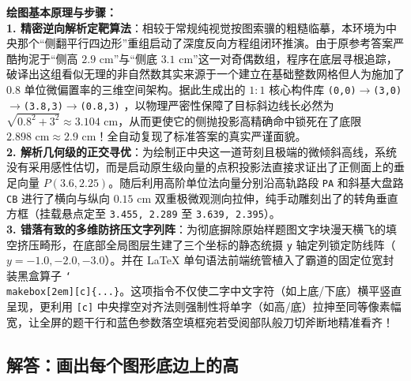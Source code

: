 \vspace{0.6cm}

{\small\color{blue!70!black}
\textbf{绘图基本原理与步骤：}\\
\textbf{1. 精密逆向解析定靶算法}：相较于常规纯视觉按图索骥的粗糙临摹，本环境为中央那个“侧翻平行四边形”重组启动了深度反向方程组闭环推演。由于原参考答案严酷拘泥于“侧高 $2.9\text{ cm}$”与“侧底 $3.1\text{ cm}$”这一对奇偶数组，程序在底层寻根追踪，破译出这组看似无理的非自然数其实来源于一个建立在基础整数网格但人为施加了 $0.8$ 单位微偏置率的三维空间架构。据此生成出的 $1:1$ 核心构件库 \texttt{(0,0)$\to$(3,0)$\to$(3.8,3)$\to$(0.8,3)} ，以物理严密性保障了目标斜边线长必然为 $\sqrt{0.8^2 + 3^2} \approx 3.104 \text{ cm}$，从而更使它的侧抛投影高精确命中锁死在了底限 $2.898 \text{ cm} \approx 2.9 \text{ cm}$！全自动复现了标准答案的真实严谨面貌。\\
\textbf{2. 解析几何级的正交寻优}：为绘制正中央这一道苛刻且极端的微倾斜高线，系统没有采用感性估切，而是启动原生级向量的点积投影法直接求证出了正侧面上的垂足向量 $P(3.6, 2.25)$。随后利用高阶单位法向量分别沿高轨路段 \texttt{PA} 和斜基大盘路 \texttt{CB} 进行了横向与纵向 $0.15\text{ cm}$ 双重极微观测向拉伸，纯手动雕刻出了的转角垂直方框（挂载悬点定至 \texttt{3.455, 2.289} 至 \texttt{3.639, 2.395}）。\\
\textbf{3. 错落有致的多维防挤压文字列阵}：为彻底摒除原始样题图文字块漫天横飞的填空挤压畸形，在底部全局图层生建了三个坐标的静态统摄 \texttt{y} 轴定列锁定防线阵（$y={-}1.0, {-}2.0, {-}3.0$）。并在 LaTeX 单句语法前端统管植入了霸道的固定位宽封装黑盒算子 \texttt{\char`\\makebox[2em][c]\{...\}}。这项指令不仅使二字中文字符（如上底/下底）横平竖直呈现，更利用 \texttt{[c]} 中央撑空对齐法则强制性将单字（如高/底）拉抻至同等像素幅宽，让全屏的题干行和蓝色参数落空填框宛若受阅部队般刀切斧断地精准看齐！
}


\newpage

\newpage

\subsection{解答：画出每个图形底边上的高}

\vspace{0.6cm}

